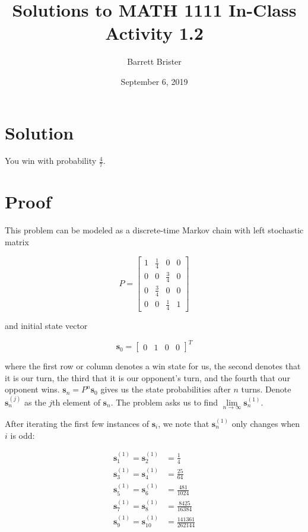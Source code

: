 \documentclass[]{article}
\title{Solutions to MATH 1111 In-Class Activity 1.2}
\author{Barrett Brister}
\date{September 6, 2019}
\begin{document}
	
\section{Solution}
You win with probability $\frac{4}{7}$.

\section{Proof}
This problem can be modeled as a discrete-time Markov chain with left stochastic matrix

\begin{equation}
P = \begin{bmatrix}
	1 & \frac{1}{4} & 0 & 0\\
	0 & 0 & \frac{3}{4} & 0\\
	0 & \frac{3}{4} & 0 & 0\\
	0 & 0 & \frac{1}{4} & 1
\end{bmatrix}
\end{equation}

and initial state vector

\begin{equation}
\mathbf{s}_0 = \begin{bmatrix}0 & 1 & 0 & 0\end{bmatrix}^T
\end{equation}

where the first row or column denotes a win state for us, the second denotes that it is our turn, the third that it is our opponent's turn, and the fourth that our opponent wins. $\mathbf{s}_n = P^n \mathbf{s}_0$ gives us the state probabilities after $n$ turns. Denote $\mathbf{s}_n^{(j)}$ as the $j$th element of $\mathbf{s}_n$. The problem asks us to find $\lim\limits_{n \rightarrow\infty} \mathbf{s}_n^{(1)}$.

After iterating the first few instances of $\mathbf{s}_i$, we note that $\mathbf{s}_n^{(1)}$ only changes when $i$ is odd:

\begin{equation}
	\begin{aligned}
	\mathbf{s}_1^{(1)} = \mathbf{s}_2^{(1)} &= \frac{1}{4}\\
	\mathbf{s}_3^{(1)} = \mathbf{s}_4^{(1)}  &= \frac{25}{64}\\
	\mathbf{s}_5^{(1)} = \mathbf{s}_6^{(1)}  &= \frac{481}{1024}\\
	\mathbf{s}_7^{(1)} = \mathbf{s}_8^{(1)}  &= \frac{8425}{16384}\\
	\mathbf{s}_9^{(1)} = \mathbf{s}_{10}^{(1)}  &= \frac{141361}{262144}\\
	\end{aligned}
\end{equation}
\end{document}
